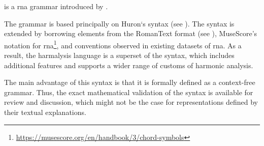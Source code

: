 

 is a \gls{rna} grammar introduced by
\textcite{napoleslopez2020harmalysis}.

The  grammar is based principally on
Huron‘s  syntax (see
). The syntax is extended by
borrowing elements from the RomanText format (see
), MuseScore's notation for
\gls{rna}\footnote{\href{https://musescore.org/en/handbook/3/chord-symbols\#rna}{https://musescore.org/en/handbook/3/chord-symbols}},
and conventions observed in existing datasets of \gls{rna}.
As  a result,  the harmalysis language is a superset  of
the  syntax,  which includes additional
features and supports a wider range of customs of harmonic
analysis.

The main advantage of this syntax is that it is formally
defined as a context-free grammar. Thus, the exact
mathematical validation of the syntax is available for
review and discussion, which might not be the case for
representations defined by their textual explanations.
